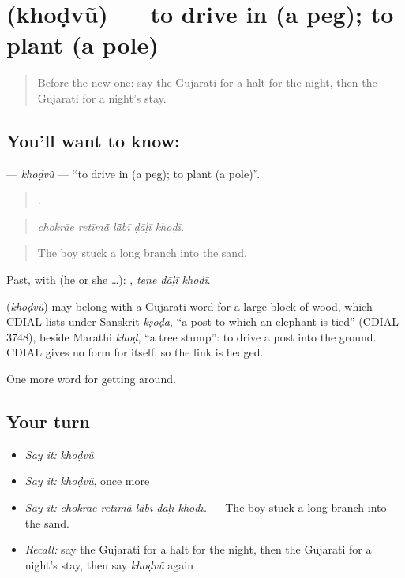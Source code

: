 \section[\texorpdfstring{\gu{ખોડવું} (khoḍvũ)}{ખોડવું (khoḍvũ)}]{ (khoḍvũ) — to drive in (a peg); to plant (a pole)}

\label{lesson:GU-C412-khodvu-peg}



\begin{quote}
Before the new one: say the Gujarati for a halt for the night, then the Gujarati for a night's stay.
\end{quote}

\subsection*{You'll want to know: }
\textbf{} — \emph{khoḍvũ} — \textquotedblleft{}to drive in (a peg); to plant (a pole)\textquotedblright{}.

\begin{quote}
    .
\end{quote}

\begin{quote}
\emph{chokrāe retīmā̃ lā̃bī ḍāḷī khoḍī.}
\end{quote}

\begin{quote}
The boy stuck a long branch into the sand.
\end{quote}

Past, with  (he or she …):   , \emph{teṇe ḍāḷī khoḍī}.

\begin{cousinweb}
\textbf{} (\emph{khoḍvũ}) may belong with a Gujarati word for a large block of wood, which CDIAL lists under Sanskrit \emph{kṣōḍa}, \textquotedblleft{}a post to which an elephant is tied\textquotedblright{} (CDIAL 3748), beside Marathi \emph{khoḍ}, \textquotedblleft{}a tree stump\textquotedblright{}: to drive a post into the ground. CDIAL gives no form for  itself, so the link is hedged.
\end{cousinweb}

\begin{grammarlens}[title={What you've built}]
One more word for getting around.
\end{grammarlens}

\subsection*{Your turn}
\begin{itemize}
\raggedright
  \item \emph{Say it:} \emph{khoḍvũ}
  \item \emph{Say it:} \emph{khoḍvũ}, once more
  \item \emph{Say it:} \emph{chokrāe retīmā̃ lā̃bī ḍāḷī khoḍī.} — The boy stuck a long branch into the sand.
  \item \emph{Recall:} say the Gujarati for a halt for the night, then the Gujarati for a night's stay, then say \emph{khoḍvũ} again
\end{itemize}

